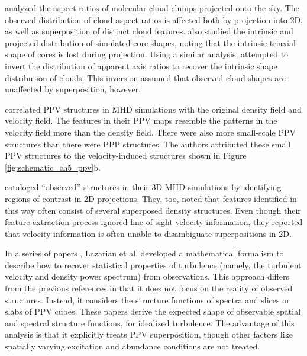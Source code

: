 \cite{http://adsabs.harvard.edu/abs/2003ApJ...592..203G} analyzed the aspect ratios of molecular cloud clumps projected onto the sky. The observed distribution of cloud aspect ratios is affected
both by projection into 2D, as well as superposition of distinct cloud features. \cite{http://adsabs.harvard.edu/abs/2009ApJ...693..914O} also studied the intrinsic and projected distribution of simulated core shapes, noting that the intrinsic triaxial shape of cores is lost during projection.
Using a similar analysis,  \cite{http://adsabs.harvard.edu/abs/2002ApJ...569..280J} attempted to invert the
distribution of apparent axis ratios to recover the intrinsic shape distribution of clouds. This inversion assumed that observed cloud shapes are unaffected by superposition, however.

\cite{http://adsabs.harvard.edu/abs/2000ApJ...532..353P}  correlated PPV structures in MHD simulations with the original density field and velocity field. The features in their PPV maps resemble the patterns in the velocity field more  than the density field. There were also more small-scale PPV structures than there were PPP structures. The authors attributed these small PPV structures to the velocity-induced structures shown in Figure \ref{fig:schematic_ch5_ppv}b.

\cite{http://adsabs.harvard.edu/abs/2001ApJ...546..980O} cataloged ``observed'' structures in their 3D MHD simulations by identifying regions of contrast in 2D projections. They, too, noted that features identified in this way often consist of several superposed density structures. Even though their feature extraction process ignored line-of-sight velocity information, they reported that velocity information is often unable to disambiguate superpositions in 2D.

In a series of papers \citep{http://adsabs.harvard.edu/abs/2000ApJ...537..720L, http://adsabs.harvard.edu/abs/2004ApJ...616..943L,
http://adsabs.harvard.edu/abs/2006ApJ...652.1348L}, Lazarian et al. developed a mathematical formalism to describe how to recover statistical properties of turbulence (namely, the turbulent velocity and density power spectrum) from observations. This approach differs from the previous references in that it does not focus on the reality of observed structures. Instead,
it considers the structure functions of spectra and slices or slabs of PPV cubes. These papers derive the expected shape of observable spatial and spectral structure functions, for idealized turbulence. The advantage of this analysis is that it explicitly treats PPV superposition, though other factors like spatially varying excitation and abundance conditions are not treated.

